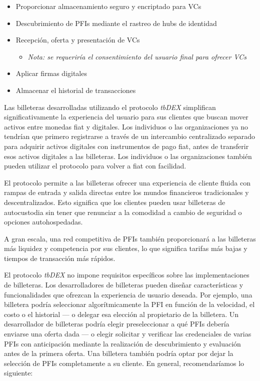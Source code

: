 \documentclass[11pt]{article}
\begin{document}
\begin{itemize}
	\item Proporcionar almacenamiento seguro y encriptado para VCs

	\item Descubrimiento de PFIs mediante el rastreo de hubs de identidad

	\item Recepción, oferta y presentación de VCs

\begin{itemize}
	\item \textit{Nota: se requeriría el consentimiento del usuario final para ofrecer VCs}

\end{itemize}
	\item Aplicar firmas digitales

	\item Almacenar el historial de transacciones

\vspace{1\baselineskip}
\end{itemize}
Las billeteras desarrolladas utilizando el protocolo \textit{tbDEX} simplifican significativamente la experiencia del usuario para sus clientes que buscan mover activos entre monedas fiat y digitales. Los individuos o las organizaciones ya no tendrían que primero registrarse a través de un intercambio centralizado separado para adquirir activos digitales con instrumentos de pago fiat, antes de transferir esos activos digitales a las billeteras. Los individuos o las organizaciones también pueden utilizar el protocolo para volver a fiat con facilidad.

\vspace{1\baselineskip}
El protocolo permite a las billeteras ofrecer una experiencia de cliente fluida con rampas de entrada y salida directas entre los mundos financieros tradicionales y descentralizados. Esto significa que los clientes pueden usar billeteras de autocustodia sin tener que renunciar a la comodidad a cambio de seguridad o opciones autohospedadas.

\vspace{1\baselineskip}
A gran escala, una red competitiva de PFIs también proporcionará a las billeteras más liquidez y competencia por sus clientes, lo que significa tarifas más bajas y tiempos de transacción más rápidos.

\vspace{1\baselineskip}
El protocolo \textit{tbDEX} no impone requisitos específicos sobre las implementaciones de billeteras. Los desarrolladores de billeteras pueden diseñar características y funcionalidades que ofrezcan la experiencia de usuario deseada. Por ejemplo, una billetera podría seleccionar algorítmicamente la PFI en función de la velocidad, el costo o el historial — o delegar esa elección al propietario de la billetera. Un desarrollador de billeteras podría elegir preseleccionar a qué PFIs debería enviarse una oferta dada — o elegir solicitar y verificar las credenciales de varias PFIs con anticipación mediante la realización de descubrimiento y evaluación antes de la primera oferta. Una billetera también podría optar por dejar la selección de PFIs completamente a su cliente. En general, recomendaríamos lo siguiente:
\end{document}
